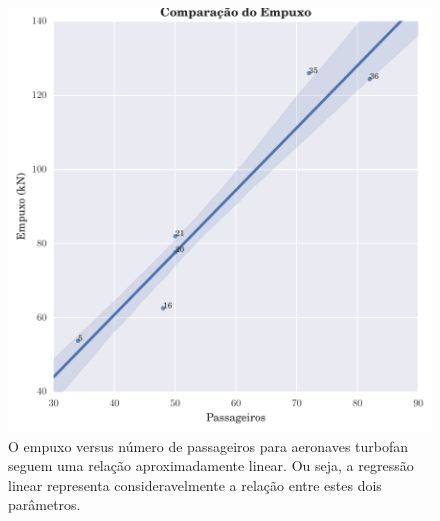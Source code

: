 \begin{figure}
\centering
\includegraphics{../autogenerated/graficos_comparativos/empuxo.pdf}
\caption[Comparação do empuxo para aeronaves com turbofan]{O empuxo versus número de passageiros para aeronaves turbofan seguem uma relação aproximadamente linear. Ou seja, a regressão linear representa consideravelmente a relação entre estes dois parâmetros.}
\label{fig:empuxo}
\end{figure}

